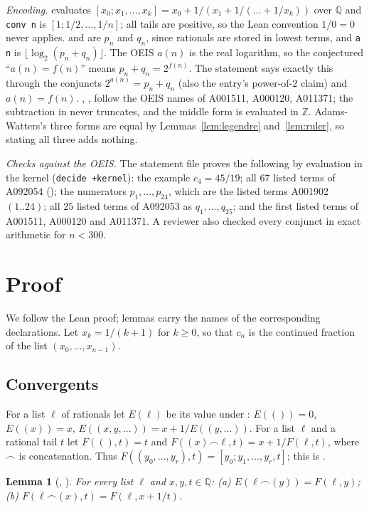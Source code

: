 \documentclass[11pt]{amsart}
\theoremstyle{plain}
\newtheorem{lemma}[theorem]{Lemma}
\theoremstyle{definition}
\newcommand{\Q}{\mathbb{Q}}
\newcommand{\Z}{\mathbb{Z}}
\begin{document}
\emph{Encoding.}  evaluates $[x_0;x_1,\dots,x_k]=x_0+1/(x_1+1/(\dots+1/x_k))$ over $\Q$ and \texttt{conv n} is $[1;1/2,\dots,1/n]$; all tails are positive, so the Lean convention $1/0=0$ never applies.  and  are $p_n$ and $q_n$, since rationals are stored in lowest terms, and \texttt{a n} is $\lfloor\log_2(p_n+q_n)\rfloor$. The OEIS $a(n)$ is the real logarithm, so the conjectured ``$a(n)=f(n)$'' means $p_n+q_n=2^{f(n)}$. The statement says exactly this through the conjuncts $2^{a(n)}=p_n+q_n$ (also the entry's power-of-$2$ claim) and $a(n)=f(n)$. , ,  follow the OEIS names of A001511, A000120, A011371; the subtraction in  never truncates, and the middle form is evaluated in $\Z$. Adams-Watters's three forms are equal by Lemmas~\ref{lem:legendre} and~\ref{lem:ruler}, so stating all three adds nothing.

\emph{Checks against the OEIS.} The statement file proves the following by evaluation in the kernel (\texttt{decide +kernel}): the example $c_4=45/19$; all $67$ listed terms of A092054 (); the numerators $p_1,\dots,p_{24}$, which are the listed terms A001902$(1..24)$; all $25$ listed terms of A092053 as $q_1,\dots,q_{25}$; and the first listed terms of A001511, A000120 and A011371. A reviewer also checked every conjunct in exact arithmetic for $n<300$.

\section{Proof}\label{sec:proof}

We follow the Lean proof; lemmas carry the names of the corresponding declarations. Let $x_k=1/(k+1)$ for $k\ge0$, so that $c_n$ is the continued fraction of the list $(x_0,\dots,x_{n-1})$.

\subsection{Convergents}\label{sec:cf}
For a list $\ell$ of rationals let $E(\ell)$ be its value under : $E(())=0$, $E((x))=x$, $E((x,y,\dots))=x+1/E((y,\dots))$. For a list $\ell$ and a rational tail $t$ let $F((),t)=t$ and $F((x)\frown\ell,t)=x+1/F(\ell,t)$, where $\frown$ is concatenation. Thus $F((y_0,\dots,y_r),t)=[y_0;y_1,\dots,y_r,t]$; this is .

\begin{lemma}[, ]\label{lem:tail}
For every list $\ell$ and $x,y,t\in\Q$: (a) $E(\ell\frown(y))=F(\ell,y)$; (b) $F(\ell\frown(x),t)=F(\ell,x+1/t)$.
\end{lemma}
\end{document}
